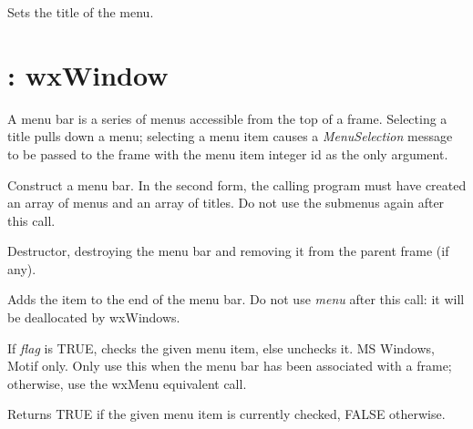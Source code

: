 Sets the title of the menu.


\section{: wxWindow}\label{wxmenubar}

A menu bar is a series of menus accessible from the top of a frame.
Selecting a title pulls down a menu; selecting a menu item causes a {\it
MenuSelection} message to be passed to the frame with the menu item
integer id as the only argument.




Construct a menu bar. In the second form, the calling program must have
created an array of menus and an array of titles. Do not use the
submenus again after this call.



Destructor, destroying the menu bar and removing it from the parent frame (if any).



Adds the item to the end of the menu bar. Do not use {\it menu} after
this call: it will be deallocated by wxWindows.



If {\it flag} is TRUE, checks the given menu item, else unchecks it.
MS Windows, Motif only. Only use this when the menu bar has been associated
with a frame; otherwise, use the wxMenu equivalent call.



Returns TRUE if the given menu item is currently checked, FALSE otherwise.




